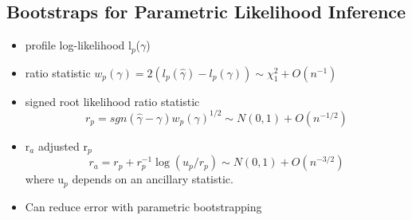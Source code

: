 \documentclass[bigger]{beamer}
\begin{document}
\subsection{Bootstraps for Parametric Likelihood Inference}
\label{sec-1-3}


\begin{itemize}
\item profile log-likelihood l$_p$($\gamma$)
\item ratio statistic $w_p(\gamma) = 2(l_p(\hat{\gamma})-l_p(\gamma)) \sim
  \chi^2_1 + O(n^{-1})$
\item signed root likelihood ratio statistic $$r_p =
  sgn(\hat{\gamma}-\gamma)w_p(\gamma)^{1/2} \sim N(0,1) +
  O(n^{-1/2})$$
\item r$_a$ adjusted r$_p$ $$r_a = r_p + r_p^{-1}\log(u_p/r_p) \sim N(0,1) +
  O(n^{-3/2})$$ where u$_p$ depends on an ancillary statistic.
\item Can reduce error with parametric bootstrapping
\end{itemize}
\end{document}
